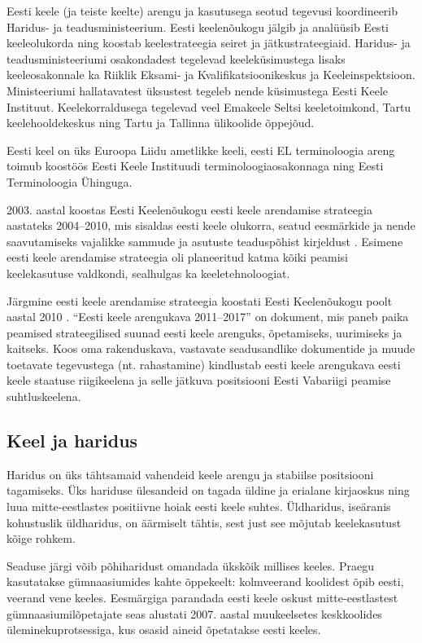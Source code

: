 \documentclass[]{../metanetpaper}
\begin{document}
\begin{multicols}{2}

Eesti keele (ja teiste keelte) arengu ja kasutusega seotud tegevusi koordineerib Haridus- ja teadusministeerium. 
Eesti keelenõukogu jälgib ja analüüsib Eesti keeleolukorda ning koostab keelestrateegia seiret ja jätkustrateegiaid.
Haridus- ja teadusministeeriumi osakondadest tegelevad keeleküsimustega lisaks keeleosakonnale ka Riiklik Eksami- ja Kvalifikatsioonikeskus ja Keeleinspektsioon. 
Ministeeriumi hallatavatest üksustest tegeleb nende küsimustega Eesti Keele Instituut. Keelekorraldusega tegelevad veel Emakeele Seltsi keeletoimkond, Tartu keelehooldekeskus ning Tartu ja Tallinna ülikoolide õppejõud.

Eesti keel on üks Euroopa Liidu ametlikke keeli, eesti EL terminoloogia areng toimub koostöös Eesti Keele Instituudi terminoloogiaosakonnaga ning Eesti Terminoloogia Ühinguga.

2003. aastal koostas Eesti Keelenõukogu eesti keele arendamise
strateegia aastateks 2004--2010, mis sisaldas eesti keele olukorra,
seatud eesmärkide ja nende saavutamiseks vajalikke sammude ja asutuste
teaduspõhist kirjeldust \cite{KeeleStratEst}.  
Esimene eesti keele arendamise strateegia oli planeeritud katma kõiki peamisi keelekasutuse valdkondi, sealhulgas ka keeletehnoloogiat.

Järgmine eesti keele arendamise strateegia koostati Eesti Keelenõukogu poolt aastal 2010 \cite{DevPlan}. 
``Eesti keele arengukava 2011--2017'' on dokument, mis paneb paika
peamised strateegilised suunad eesti keele arenguks, õpetamiseks,
uurimiseks ja kaitseks.   
Koos oma rakenduskava, vastavate seadus\-andlike dokumentide ja muude toetavate tegevustega (nt. rahastamine) kindlustab eesti keele arengukava eesti keele staatuse riigikeelena ja selle jätkuva positsiooni Eesti Vabariigi peamise suhtluskeelena.

\subsection{Keel ja haridus}

Haridus on üks tähtsamaid vahendeid keele arengu ja stabiilse positsiooni tagamiseks. 
Üks hariduse ülesandeid on tagada üldine ja erialane kirjaoskus ning luua mitte-eestlastes positiivne hoiak eesti keele suhtes. 
Üldharidus, iseäranis kohustuslik üldharidus, on äärmiselt tähtis, sest just see mõjutab keelekasutust kõige rohkem.
 
Seaduse järgi võib põhiharidust omandada ükskõik millises keeles. 
Praegu kasutatakse gümnaasiumides kahte õppekeelt: kolmveerand koolidest õpib eesti, veerand vene keeles. 
Eesmärgiga parandada eesti keele oskust mitte-eestlastest gümnaasiumilõpetajate seas alustati 2007. aastal muukeelsetes keskkoolides üleminekuprotsessiga, kus osasid aineid õpetatakse eesti keeles.


\end{multicols}
\end{document}
